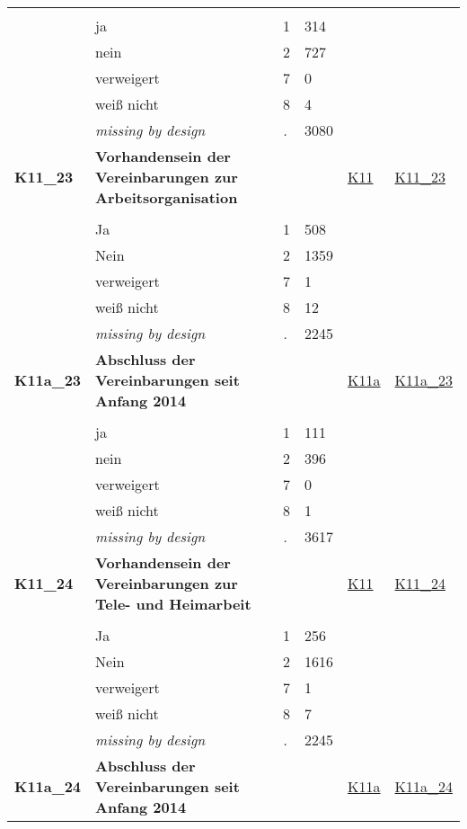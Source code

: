 \begin{longtable}{| L{2.45cm} | L{6cm} | C{1.5cm} | R{1cm} | C{2.25cm} | C{2.25cm} |}
   &  &  &  &  &  \\ 
   & ja & 1 & 314 &  &  \\ 
   & nein & 2 & 727 &  &  \\ 
   & verweigert & 7 & 0 &  &  \\ 
   & weiß nicht & 8 & 4 &  &  \\ 
   & \textit{missing by design} & \textit{.} & 3080 &  &  \\ 
   \midrule
\textbf{K11\_23}\label{var:K11:23} & \textbf{Vorhandensein der Vereinbarungen zur Arbeitsorganisation} &  &  & \hyperref[K11]{K11} & \hyperref[var:suf:K11:23]{K11\_23} \\ 
   &  &  &  &  &  \\ 
   & Ja & 1 & 508 &  &  \\ 
   & Nein & 2 & 1359 &  &  \\ 
   & verweigert & 7 & 1 &  &  \\ 
   & weiß nicht & 8 & 12 &  &  \\ 
   & \textit{missing by design} & \textit{.} & 2245 &  &  \\ 
   \midrule
\textbf{K11a\_23}\label{var:K11a:23} & \textbf{Abschluss der Vereinbarungen seit Anfang 2014} &  &  & \hyperref[K11a]{K11a} & \hyperref[var:suf:K11a:23]{K11a\_23} \\ 
   &  &  &  &  &  \\ 
   & ja & 1 & 111 &  &  \\ 
   & nein & 2 & 396 &  &  \\ 
   & verweigert & 7 & 0 &  &  \\ 
   & weiß nicht & 8 & 1 &  &  \\ 
   & \textit{missing by design} & \textit{.} & 3617 &  &  \\ 
   \midrule
\textbf{K11\_24}\label{var:K11:24} & \textbf{Vorhandensein der Vereinbarungen zur Tele- und Heimarbeit} &  &  & \hyperref[K11]{K11} & \hyperref[var:suf:K11:24]{K11\_24} \\ 
   &  &  &  &  &  \\ 
   & Ja & 1 & 256 &  &  \\ 
   & Nein & 2 & 1616 &  &  \\ 
   & verweigert & 7 & 1 &  &  \\ 
   & weiß nicht & 8 & 7 &  &  \\ 
   & \textit{missing by design} & \textit{.} & 2245 &  &  \\ 
   \midrule
\textbf{K11a\_24}\label{var:K11a:24} & \textbf{Abschluss der Vereinbarungen seit Anfang 2014} &  &  & \hyperref[K11a]{K11a} & \hyperref[var:suf:K11a:24]{K11a\_24} \\ 

\end{longtable}
